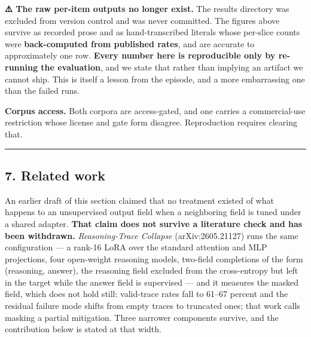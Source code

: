 \textbf{⚠️ The raw per-item outputs no longer exist.} The results directory was excluded from version
control and was never committed. The figures above survive as recorded prose and as hand-transcribed
literals whose per-slice counts were \textbf{back-computed from published rates}, and are accurate to
approximately one row. \textbf{Every number here is reproducible only by re-running the evaluation}, and
we state that rather than implying an artifact we cannot ship. This is itself a lesson from the
episode, and a more embarrassing one than the failed runs.

\textbf{Corpus access.} Both corpora are access-gated, and one carries a commercial-use restriction whose
license and gate form disagree. Reproduction requires clearing that.

\begin{center}\rule{0.5\linewidth}{0.5pt}\end{center}

\subsection{7. Related work}\label{related-work}

An earlier draft of this section claimed that no treatment existed of what happens to an unsupervised
output field when a neighboring field is tuned under a shared adapter. \textbf{That claim does not survive
a literature check and has been withdrawn.} \emph{Reasoning-Trace Collapse} (arXiv:2605.21127) runs the
same configuration --- a rank-16 LoRA over the standard attention and MLP projections, four open-weight
reasoning models, two-field completions of the form (reasoning, answer), the reasoning field excluded
from the cross-entropy but left in the target while the answer field is supervised --- and it measures
the masked field, which does not hold still: valid-trace rates fall to 61--67 percent and the residual
failure mode shifts from empty traces to truncated ones; that work calls masking a partial
mitigation. Three narrower components survive, and the contribution below is stated at that width.

